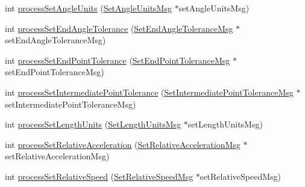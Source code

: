 \begin{DoxyCompactItemize}
\item 
int \hyperlink{class_my_controller_a171f022e207b9155be4b1a7a6c824943}{processSetAngleUnits} (\hyperlink{class_set_angle_units_msg}{SetAngleUnitsMsg} $\ast$setAngleUnitsMsg)
\item 
int \hyperlink{class_my_controller_a43555e73c107fa20c9efb1974b6172d0}{processSetEndAngleTolerance} (\hyperlink{class_set_end_angle_tolerance_msg}{SetEndAngleToleranceMsg} $\ast$setEndAngleToleranceMsg)
\item 
int \hyperlink{class_my_controller_a773f4df4ced863d73b114badf007555d}{processSetEndPointTolerance} (\hyperlink{class_set_end_point_tolerance_msg}{SetEndPointToleranceMsg} $\ast$setEndPointToleranceMsg)
\item 
int \hyperlink{class_my_controller_afe4607ed0e9fda884848671c3c3e79f4}{processSetIntermediatePointTolerance} (\hyperlink{class_set_intermediate_point_tolerance_msg}{SetIntermediatePointToleranceMsg} $\ast$setIntermediatePointToleranceMsg)
\item 
int \hyperlink{class_my_controller_a336fdb6e3a80e2c3d14e4ac2e7592649}{processSetLengthUnits} (\hyperlink{class_set_length_units_msg}{SetLengthUnitsMsg} $\ast$setLengthUnitsMsg)
\item 
int \hyperlink{class_my_controller_a17019de4f9ebc4d07c05d141544e4fba}{processSetRelativeAcceleration} (\hyperlink{class_set_relative_acceleration_msg}{SetRelativeAccelerationMsg} $\ast$setRelativeAccelerationMsg)
\item 
int \hyperlink{class_my_controller_ac073c56d47842da82036a49777e6fb64}{processSetRelativeSpeed} (\hyperlink{class_set_relative_speed_msg}{SetRelativeSpeedMsg} $\ast$setRelativeSpeedMsg)
\end{DoxyCompactItemize}


